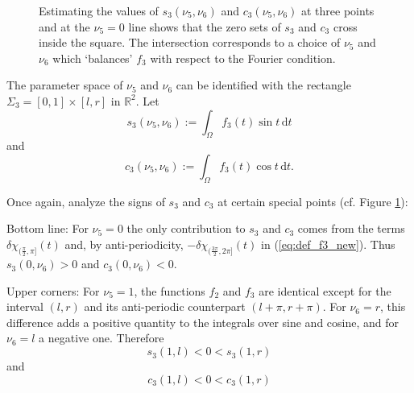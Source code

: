 \documentclass{article}
\newcommand{\dt}{\,\mathrm{d}t}
\newcommand{\R}{\mathbb{R}\xspace}
\def\blue{blue}
\def\orange{orange}
\def\blue{black}
\def\orange{black}
\begin{document}
\begin{figure}

    \caption{Estimating the values of $s_3(\nu_5,\nu_6)$ and $c_3(\nu_5,\nu_6)$ at three points and at the $\nu_5 = 0$ line shows that the zero sets of $s_3$ and $c_3$ cross inside the square. The intersection corresponds to a choice of $\nu_5$ and $\nu_6$ which `balances' $f_3$ with respect to the Fourier condition.}
    \label{fig:plot_square_f3}
\end{figure} 

The parameter space of $\nu_5$ and $\nu_6$ can be identified with the rectangle $\Sigma_3=[0,1] \times [l,r]$ in $\R^2$. Let
\begin{equation*}
    s_3(\nu_5, \nu_6) := \int_\Omega f_3(t) \sin t \dt 
\end{equation*}
and
\begin{equation*}
    c_3(\nu_5, \nu_6) := \int_\Omega f_3(t) \cos t \dt.
\end{equation*}

Once again, analyze the signs of $s_3$ and $c_3$ at certain special points (cf. Figure \ref{fig:plot_square_f3}):

Bottom line: For $\nu_5 = 0$ the only contribution to $s_3$ and $c_3$ comes from the terms $\delta \chi_{(\frac{\pi}{2}, \pi]}(t)$ and, by anti-periodicity, $-\delta \chi_{(\frac{3\pi}{2}, 2\pi]}(t)$ in (\ref{eq:def_f3_new}). Thus $s_3(0,\nu_6) > 0$ and $c_3(0,\nu_6) < 0$.

Upper corners: For $\nu_5 = 1$, the functions $f_2$ and $f_3$ are identical except for the interval $(l, r)$ and its anti-periodic counterpart $(l+\pi, r+\pi)$. For $\nu_6 = r$, this difference adds a positive quantity to the integrals over sine and cosine, and for $\nu_6 = l$ a negative one. Therefore
\[s_3(1,l) <  0 < s_3(1,r)\]
and
\[c_3(1,l) <  0 < c_3(1,r)\]
\end{document}
